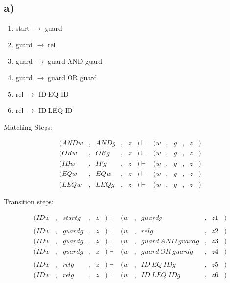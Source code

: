 \subsection*{a)}

\begin{enumerate}
\item start $\rightarrow$ guard
\item guard $\rightarrow$ rel
\item guard $\rightarrow$ guard AND guard
\item guard $\rightarrow$ guard OR guard
\item rel $\rightarrow$ ID EQ ID
\item rel $\rightarrow$ ID LEQ ID
\end{enumerate}

Matching Steps:

\begin{equation*}
  \begin{aligned}
          & (ANDw&, &ANDg&, &z &) \vdash   & (w&,  &g&, &z &) \\
          & (ORw&, &ORg&, &z &) \vdash   & (w&,  &g&, &z &) \\
          & (IDw&, &IFg&, &z &) \vdash   & (w&,  &g&, &z &) \\
          & (EQw&, &EQw&, &z &) \vdash   & (w&,  &g&, &z &) \\
          & (LEQw&, &LEQg&, &z &) \vdash   & (w&,  &g&, &z &)
\end{aligned}
\end{equation*}

Transition steps:

\begin{equation*}
  \begin{aligned}
          & (IDw&, &startg&, &z &) \vdash   & (w&,  &guardg&, &z1 &) \\
          & \\
          & (IDw&, &guardg&, &z &) \vdash   & (w&,  &relg&, &z2 &) \\
          & (IDw&, &guardg&, &z &) \vdash   & (w&,  &guard\:AND\:guardg&, &z3 &) \\
          & (IDw&, &guardg&, &z &) \vdash   & (w&,  &guard\:OR\:guardg&, &z4 &) \\
          & \\
          & (IDw&, &relg&, &z &) \vdash   & (w&,  &ID\:EQ\:IDg&, &z5 &) \\
          & (IDw&, &relg&, &z &) \vdash   & (w&,  &ID\:LEQ\:IDg&, &z6 &)
\end{aligned}
\end{equation*}

